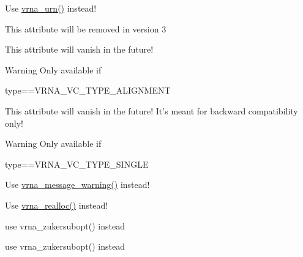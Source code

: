 \begin{DoxyRefList}
\item[\label{deprecated__deprecated000153}%
\hypertarget{deprecated__deprecated000153}{}%
Global \hyperlink{utils_8h_aaa328491c84996e445d027fde9800f2e}{urn} (void)]Use \hyperlink{group__utils_ga384e256ebb295d04a14426179db0dd6e}{vrna\-\_\-urn()} instead!  
\item[\label{deprecated__deprecated000092}%
\hypertarget{deprecated__deprecated000092}{}%
Global \hyperlink{group__energy__parameters_a378d5bcf2bae1f3ec84c912c7d3908d2}{vrna\-\_\-exp\-\_\-param\-\_\-s\-:\-:id} ]This attribute will be removed in version 3  
\item[\label{deprecated__deprecated000048}%
\hypertarget{deprecated__deprecated000048}{}%
Global \hyperlink{group__fold__compound_abf5e82d14649b6179ae60ed7da6e4fc0}{vrna\-\_\-fc\-\_\-s\-:\-:pscore\-\_\-pf\-\_\-compat} ]This attribute will vanish in the future! \begin{DoxyWarning}{Warning}
Only available if\begin{DoxyVerb}type==VRNA_VC_TYPE_ALIGNMENT \end{DoxyVerb}
  
\end{DoxyWarning}

\item[\label{deprecated__deprecated000047}%
\hypertarget{deprecated__deprecated000047}{}%
Global \hyperlink{group__fold__compound_a7fe1235ce3d41287695f1ae1e283e8fc}{vrna\-\_\-fc\-\_\-s\-:\-:ptype\-\_\-pf\-\_\-compat} ]This attribute will vanish in the future! It's meant for backward compatibility only! \begin{DoxyWarning}{Warning}
Only available if\begin{DoxyVerb}type==VRNA_VC_TYPE_SINGLE \end{DoxyVerb}
  
\end{DoxyWarning}

\item[\label{deprecated__deprecated000148}%
\hypertarget{deprecated__deprecated000148}{}%
Global \hyperlink{utils_8h_af2355fa8746f2f30fbe71db65dea3d51}{warn\-\_\-user} (const char message\mbox{[}\mbox{]})]Use \hyperlink{group__utils_gafe4072406bd287c6857763dd7d2fe1f1}{vrna\-\_\-message\-\_\-warning()} instead!  
\item[\label{deprecated__deprecated000151}%
\hypertarget{deprecated__deprecated000151}{}%
Global \hyperlink{utils_8h_a9037ada838835b1b9db41581a021b0c8}{xrealloc} (void $\ast$p, unsigned size)]Use \hyperlink{group__utils_ga27f4719a66c6f90d1cca3d1e6e696c6a}{vrna\-\_\-realloc()} instead!  
\item[\label{deprecated__deprecated000144}%
\hypertarget{deprecated__deprecated000144}{}%
Global \hyperlink{group__subopt__zuker_ga0d5104e3ecf119d8eabd40aa5fe47f90}{zukersubopt} (const char $\ast$string)]use vrna\-\_\-zukersubopt() instead 
\item[\label{deprecated__deprecated000145}%
\hypertarget{deprecated__deprecated000145}{}%
Global \hyperlink{group__subopt__zuker_gab6d0ea8cc1d02f6dd831ca81043c9eb8}{zukersubopt\-\_\-par} (const char $\ast$string, vrna\-\_\-param\-\_\-t $\ast$parameters)]use vrna\-\_\-zukersubopt() instead
\end{DoxyRefList}